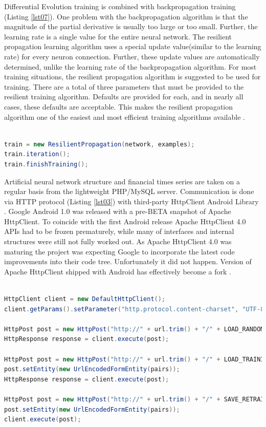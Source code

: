 \documentclass[a4paper,conference]{IEEEtran}
\begin{document}
Differential Evolution training is combined with backpropagation training (Listing \ref{lst07}). One problem with the backpropagation algorithm is that the magnitude of the partial derivative is usually too large or too small. Further, the learning rate is a single value for the entire neural network. The resilient propagation learning algorithm uses a special update value(similar to the learning rate) for every neuron connection. Further, these update values are automatically determined, unlike the learning rate of the backpropagation algorithm. For most training situations, the resilient propagation algorithm is suggested to be used for training. There are a total of three parameters that must be provided to the resilient training algorithm. Defaults are provided for each, and in nearly all cases, these defaults are acceptable. This makes the resilient propagation algorithm one of the easiest and most efficient training algorithms available \cite{Heaton-01}.

\begin{lstlisting}[caption=Resilient backpropagation training, language=Java, basicstyle=\tiny, label=lst07]

train = new ResilientPropagation(network, examples);
train.iteration();
train.finishTraining();

\end{lstlisting}

Artificial neural network structure and financial times series are taken on a regular basis from the lightweight PHP/MySQL server. Communication is done via HTTP protocol (Listing \ref{lst03}) with third-party HttpClient Android Library \cite{Sebera-01}. Google Android 1.0 was released with a pre-BETA snapshot of Apache HttpClient. To coincide with the first Android release Apache HttpClient 4.0 APIs had to be frozen prematurely, while many of interfaces and internal structures were still not fully worked out. As Apache HttpClient 4.0 was maturing the project was expecting Google to incorporate the latest code improvements into their code tree. Unfortunately it did not happen. Version of Apache HttpClient shipped with Android has effectively become a fork \cite{Apache-01}.

\begin{lstlisting}[caption=HTTP communication, language=Java, basicstyle=\tiny, label=lst03]

HttpClient client = new DefaultHttpClient();
client.getParams().setParameter("http.protocol.content-charset", "UTF-8");

HttpPost post = new HttpPost("http://" + url.trim() + "/" + LOAD_RANDOM_ANN_SCRIPT);
HttpResponse response = client.execute(post);

HttpPost post = new HttpPost("http://" + url.trim() + "/" + LOAD_TRAINING_SET_SCRIPT);
post.setEntity(new UrlEncodedFormEntity(pairs));
HttpResponse response = client.execute(post);

HttpPost post = new HttpPost("http://" + url.trim() + "/" + SAVE_RETRAINED_ANN_SCRIPT);
post.setEntity(new UrlEncodedFormEntity(pairs));
client.execute(post);

\end{lstlisting}
\end{document}
